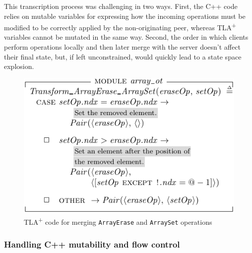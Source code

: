 \documentclass{vldb}
\begin{document}
This transcription process was challenging in two ways. First, the C++ code relies on mutable variables for expressing how the incoming operations must be modified to be correctly applied by the non-originating peer, whereas TLA\textsuperscript{+} variables cannot be mutated in the same way. Second, the order in which clients perform operations locally and then later merge with the server doesn't affect their final state, but, if left unconstrained, would quickly lead to a state space explosion.

\begin{figure}
\includegraphics{array_ot_merge_example.pdf}
\caption{TLA\textsuperscript{+} code for merging \texttt{ArrayErase} and \texttt{ArraySet} operations}
\label{fig:tlaplus_erase_set_merge}
\end{figure}

\subsubsection{Handling C++ mutability and flow control}
\end{document}
